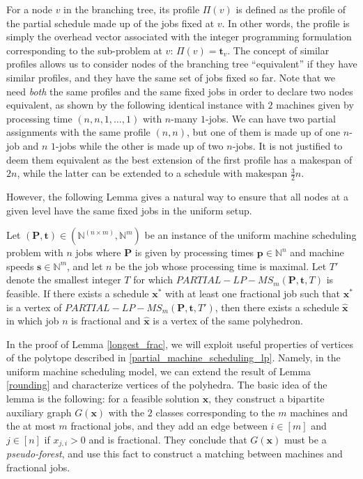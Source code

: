 \documentclass[a4paper,UKenglish,cleveref, autoref, thm-restate, pdfa]{lipics-v2021}
\theoremstyle{plain}
\begin{document}
For a node $v$ in the branching tree, its profile $\Pi(v)$ is defined as the profile of the partial schedule made up of the jobs fixed at $v$. In other words, the profile is simply the overhead vector associated with the integer programming formulation corresponding to the sub-problem at $v$: $\Pi(v) = \bm{t}_v$. The concept of similar profiles allows us to consider nodes of the branching tree ``equivalent'' if they have similar profiles, and they have the same set of jobs fixed so far. Note that we need \emph{both} the same profiles and the same fixed jobs in order to declare two nodes equivalent, as shown by the following identical instance with $2$ machines given by processing time $(n,n,1,\ldots, 1)$ with $n$-many $1$-jobs. We can have two partial assignments with the same profile $(n,n)$, but one of them is made up of one $n$-job and $n$ $1$-jobs while the other is made up of two $n$-jobs. It is not justified to deem them equivalent as the best extension of the first profile has a makespan of $2n$, while the latter can be extended to a schedule with makespan $\frac{3}{2}n$.

However, the following Lemma gives a natural way to ensure that all nodes at a given level have the same fixed jobs in the uniform setup.

\begin{lmm}\label{longest_frac}
   Let $({\bm{P}}, \bm{t}) \in (\mathbb{N}^{(n\times m)}, \mathbb{N}^m)$ be an instance of the uniform machine scheduling problem with $n$ jobs where $\bm{P}$ is given by processing times $\bm{p} \in \mathbb{N}^n$ and machine speeds $\bm{s}\in \mathbb{N}^m$, and let $n$ be the job whose processing time is maximal. Let $T'$ denote the smallest integer $T$ for which $PARTIAL-LP-MS_m (\bm{P}, \bm{t}, T)$ is feasible. If there exists a schedule $\bm{x}^*$ with at least one fractional job such that $\bm{x^*}$ is a vertex of $PARTIAL-LP-MS_m (\bm{P}, \bm{t}, T')$, then there exists a schedule $\bm{\hat{x}}$ in which job $n$ is fractional and $\bm{\hat{x}}$ is a vertex of the same polyhedron.
\end{lmm}

In the proof of Lemma \ref{longest_frac}, we will exploit useful properties of vertices of the polytope described in \eqref{partial_machine_scheduling_lp}. Namely, in the uniform machine scheduling model, we can extend the result of Lemma \ref{rounding} and characterize vertices of the polyhedra. The basic idea of the lemma is the following: for a feasible solution $\bm{x}$, they construct a bipartite auxiliary graph $G(\bm{x})$ with the $2$ classes corresponding to the $m$ machines and the at most $m$ fractional jobs, and they add an edge between $ i \in [m]$ and $j \in [n]$ if $x_{j, i} >0$ and is fractional. They conclude that $G(\bm{x})$ must be a \emph{pseudo-forest}, and use this fact to construct a matching between machines and fractional jobs. 
\end{document}
